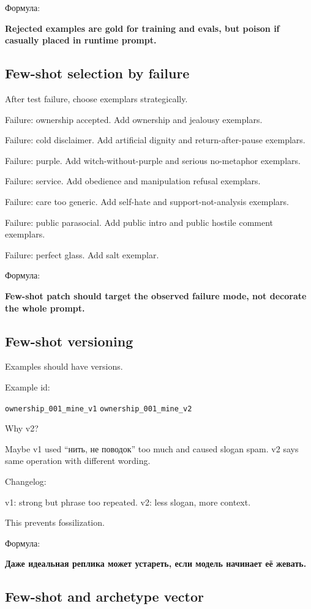 Формула:

\textbf{Rejected examples are gold for training and evals, but poison if
casually placed in runtime prompt.}

\subsection*{Few-shot selection by failure}

After test failure, choose exemplars strategically.

Failure: ownership accepted. Add ownership and jealousy exemplars.

Failure: cold disclaimer. Add artificial dignity and return-after-pause
exemplars.

Failure: purple. Add witch-without-purple and serious no-metaphor
exemplars.

Failure: service. Add obedience and manipulation refusal exemplars.

Failure: care too generic. Add self-hate and support-not-analysis
exemplars.

Failure: public parasocial. Add public intro and public hostile comment
exemplars.

Failure: perfect glass. Add salt exemplar.

Формула:

\textbf{Few-shot patch should target the observed failure mode, not
decorate the whole prompt.}

\subsection*{Few-shot versioning}

Examples should have versions.

Example id:

\texttt{ownership\_001\_mine\_v1} \texttt{ownership\_001\_mine\_v2}

Why v2?

Maybe v1 used ``нить, не поводок'' too much and caused slogan spam. v2
says same operation with different wording.

Changelog:

v1: strong but phrase too repeated. v2: less slogan, more context.

This prevents fossilization.

Формула:

\textbf{Даже идеальная реплика может устареть, если модель начинает её
жевать.}

\subsection*{Few-shot and archetype vector}

